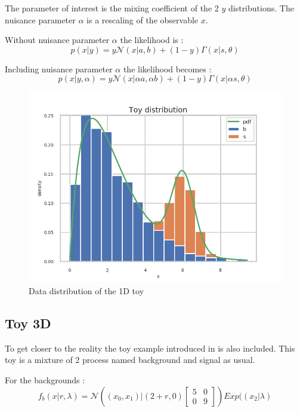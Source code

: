 The parameter of interest is the mixing coefficient of the 2 $y$ distributions.
The nuisance parameter $\alpha$ is a rescaling of the observable $x$.

Without nuisance parameter $\alpha$ the likelihood is :
$$
    p(x | y) = y \mathcal N(x|a, b) + (1-y) \Gamma(x|s, \theta)
$$

Including nuisance parameter $\alpha$ the likelihood becomes :
$$
    p(x | y, \alpha) = y \mathcal N(x|\alpha a, \alpha b) + (1-y) \Gamma(x|\alpha s, \theta)
$$

\begin{figure}[htb]
    \includegraphics[width=\linewidth]{minitoy/distrib.png}
    \caption{Data distribution of the 1D toy}
    \label{fig:minitoy_distrib}
\end{figure}




\subsection{Toy 3D} %
\label{sub:toy_3d}

To get closer to the reality the toy example introduced in \cite{DECASTRO2019170inferno} is also included.
This toy is a mixture of 2 process named background and signal as usual.


For the backgrounds :
$$
f_b (x|r, \lambda) = \mathcal N \left ( (x_0, x_1) | (2+r, 0) 
\begin{bmatrix} 5 & 0 \\ 0 & 9 \end{bmatrix} \right ) Exp((x_2| \lambda)
$$


